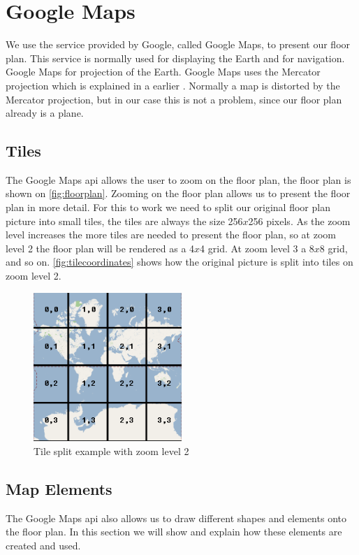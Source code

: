 \section{Google Maps}
 We use the service provided by Google, called Google Maps, to present our floor plan. This service is normally used for displaying the Earth and for navigation. Google Maps for projection of the Earth. Google Maps uses the Mercator projection which is explained in a earlier . Normally a map is distorted by the Mercator projection, but in our case this is not a problem, since our floor plan already is a plane. 
\subsection*{Tiles}
The Google Maps \ac{api} allows the user to zoom on the floor plan, the floor plan is shown on \autoref{fig:floorplan}. Zooming on the floor plan allows us to present the floor plan in more detail. For this to work we need to split our original floor plan picture into small tiles, the tiles are always the size 256$x$256 pixels. As the zoom level increases the more tiles are needed to present the floor plan, so at zoom level 2 the floor plan will be rendered as  a 4$x$4 grid. At zoom level 3 a 8$x$8 grid, and so on. \autoref{fig:tilecoordinates} shows how the original picture is split into tiles on zoom level 2.

\begin{figure}[H]
\centering
\includegraphics[width=0.5\textwidth]{img/tilecoordinates.png}
\caption{Tile split example with zoom level 2 \citep{tilecoordinates}}
\label{fig:tilecoordinates}
\end{figure}

\subsection*{Map Elements}
The Google Maps \ac{api} also allows us to draw different shapes and elements onto the floor plan. In this section we will show and explain how these elements are created and used.
